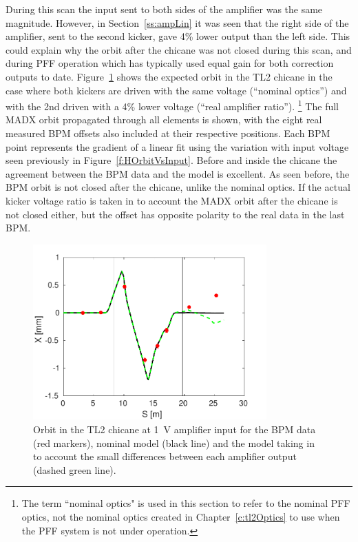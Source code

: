 During this scan the input sent to both sides of the amplifier was the same magnitude. However, in Section~\ref{ss:ampLin} it was seen that the right side of the amplifier, sent to the second kicker, gave 4\% lower output than the left side. This could explain why the orbit after the chicane was not closed during this scan, and during PFF operation which has typically used equal gain for both correction outputs to date. Figure~\ref{f:orbClosureVsAmpModel} shows the expected orbit in the TL2 chicane in the case where both kickers are driven with the same voltage (``nominal optics'') and with the 2nd driven with a 4\% lower voltage (``real amplifier ratio'').
\footnote{The term ``nominal optics" is used in this section to refer to the nominal PFF optics, not the nominal optics created in Chapter~\ref{c:tl2Optics} to use when the PFF system is not under operation.}
The full MADX orbit propagated through all elements is shown, with the eight real measured BPM offsets also included at their respective positions. Each BPM point represents the gradient of a linear fit using the variation with input voltage seen previously in Figure~\ref{f:HOrbitVsInput}. Before and inside the chicane the agreement between the BPM data and the model is excellent. As seen before, the BPM orbit is not closed after the chicane, unlike the nominal optics. If the actual kicker voltage ratio is taken in to account the MADX orbit after the chicane is not closed either, but the offset has opposite polarity to the real data in the last BPM.

\begin{figure}
  \centering
  \includegraphics[width=0.8\textwidth]{Figures/commissioning/orbClosureVsAmpModel}
  \caption{Orbit in the TL2 chicane at 1~V amplifier input for the BPM data (red markers), nominal model (black line) and the model taking in to account the small differences between each amplifier output (dashed green line).}
  \label{f:orbClosureVsAmpModel}
\end{figure}

